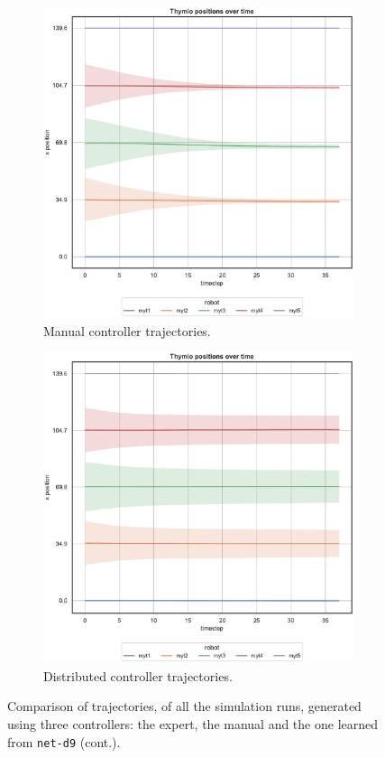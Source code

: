 \begin{figure}[!htb]\ContinuedFloat
	\begin{center}
		\begin{subfigure}[h]{0.49\textwidth}
			\centering
			\includegraphics[width=.9\textwidth]{contents/images/net-d9/position-overtime-manual}%
			\caption{Manual controller trajectories.}
		\end{subfigure}
		\hfill
		\begin{subfigure}[h]{0.49\textwidth}
			\centering
			\includegraphics[width=.9\textwidth]{contents/images/net-d9/position-overtime-learned_distributed}
			\caption{Distributed controller trajectories.}
		\end{subfigure}
	\end{center}
	\caption[]{Comparison of trajectories, of all the simulation runs, 
	generated using three controllers: the expert, the manual and the one learned 
	from \texttt{net-d9} (cont.).}
	\label{fig:net-d9traj}
\end{figure}

